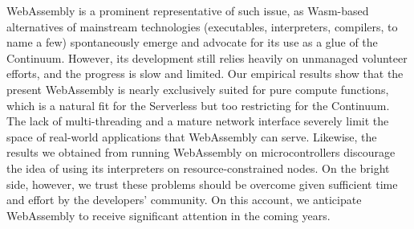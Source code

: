 WebAssembly is a prominent representative of such issue, as Wasm-based alternatives of mainstream technologies (executables, interpreters, compilers, to name a few) spontaneously emerge and advocate for its use as a glue of the Continuum. However, its development still relies heavily on unmanaged volunteer efforts, and the progress is slow and limited.
Our empirical results show that the present WebAssembly is nearly exclusively suited for pure compute functions, which is a natural fit for the Serverless but too restricting for the Continuum. The lack of multi-threading and a mature network interface severely limit the space of real-world applications that WebAssembly can serve.
Likewise, the results we obtained from running WebAssembly on microcontrollers discourage the idea of using its interpreters on resource-constrained nodes. On the bright side, however, we trust these problems should be overcome given sufficient time and effort by the developers' community. On this account, we anticipate WebAssembly to receive significant attention in the coming years.




